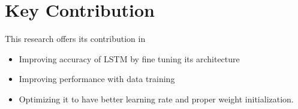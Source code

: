 \section{Key Contribution}
This research offers its contribution in 
\begin{itemize}
\item Improving accuracy of LSTM by fine tuning its architecture 
\item Improving performance with data training 
\item Optimizing it to have better learning rate and proper weight initialization.
\end{itemize}